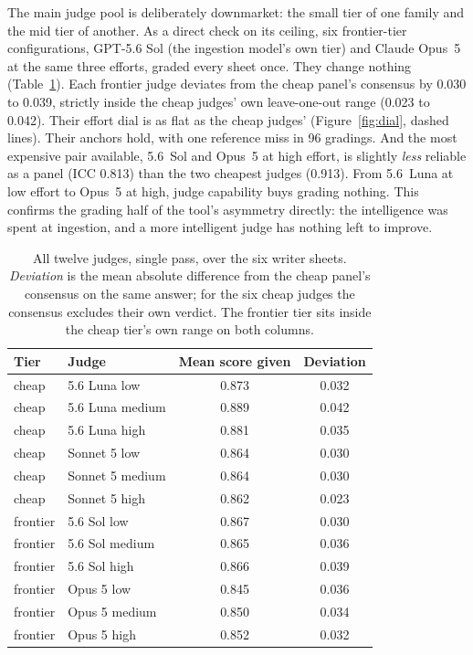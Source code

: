 \documentclass{article}
\begin{document}
The main judge pool is deliberately downmarket: the small tier of one
family and the mid tier of another. As a direct check on its ceiling, six
frontier-tier configurations, GPT-5.6 Sol (the ingestion model's own tier)
and Claude Opus~5 at the same three efforts, graded every sheet once. They
change nothing (Table~\ref{tab:judges}). Each frontier judge deviates from
the cheap panel's consensus by 0.030 to 0.039, strictly inside the cheap
judges' own leave-one-out range (0.023 to 0.042). Their effort dial is as
flat as the cheap judges'
(Figure~\ref{fig:dial}, dashed lines). Their anchors hold, with one
reference miss in 96 gradings. And the most expensive pair available, 5.6~Sol
and Opus~5 at high effort, is slightly \emph{less} reliable as a panel (ICC
0.813) than the two cheapest judges (0.913). From 5.6~Luna at low effort to
Opus~5 at high, judge capability buys grading nothing. This confirms the
grading half of the tool's asymmetry directly: the intelligence was spent at
ingestion, and a more intelligent judge has nothing left to improve.

\begin{table}[!ht]
\centering\small
\caption{All twelve judges, single pass, over the six writer sheets.
\emph{Deviation} is the mean absolute difference from the cheap panel's
consensus on the same answer; for the six cheap judges the consensus
excludes their own verdict. The frontier tier sits inside the cheap tier's
own range on both columns.}
\label{tab:judges}
\begin{tabular}{@{}llcc@{}}
\toprule
\textbf{Tier} & \textbf{Judge} & \textbf{Mean score given} & \textbf{Deviation} \\
\midrule
cheap    & 5.6 Luna low     & 0.873 & 0.032 \\
cheap    & 5.6 Luna medium  & 0.889 & 0.042 \\
cheap    & 5.6 Luna high    & 0.881 & 0.035 \\
cheap    & Sonnet 5 low     & 0.864 & 0.030 \\
cheap    & Sonnet 5 medium  & 0.864 & 0.030 \\
cheap    & Sonnet 5 high    & 0.862 & 0.023 \\
\midrule
frontier & 5.6 Sol low      & 0.867 & 0.030 \\
frontier & 5.6 Sol medium   & 0.865 & 0.036 \\
frontier & 5.6 Sol high     & 0.866 & 0.039 \\
frontier & Opus 5 low       & 0.845 & 0.036 \\
frontier & Opus 5 medium    & 0.850 & 0.034 \\
frontier & Opus 5 high      & 0.852 & 0.032 \\
\bottomrule
\end{tabular}
\end{table}
\end{document}
